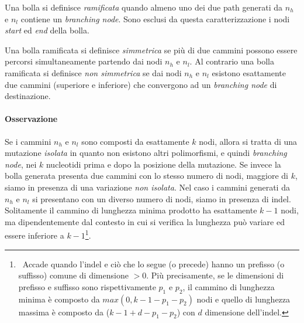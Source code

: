 \documentclass[../main.tex]{subfiles}
\begin{document}
\begin{definition}
Una bolla si definisce \textit{ramificata} quando almeno uno dei due path generati da $n_h$ e $n_l$ contiene un \textit{branching node}. Sono esclusi da questa caratterizzazione i nodi \textit{start} ed \textit{end} della bolla.
\end{definition}

\begin{definition}
Una bolla ramificata si definisce \textit{simmetrica} se più di due cammini possono essere percorsi simultaneamente partendo dai nodi $n_h$ e $n_l$. Al contrario una bolla ramificata si definisce \textit{non simmetrica} se dai nodi $n_h$ e $n_l$ esistono esattamente due cammini (superiore e inferiore) che convergono ad un \textit{branching node} di destinazione.
\end{definition}

\paragraph{Osservazione} Se i cammini $n_h$ e $n_l$ sono composti da esattamente $k$ nodi, allora si tratta di una mutazione \textit{isolata} in quanto non esistono altri polimorfismi, e quindi \textit{branching node}, nei $k$ nucleotidi prima e dopo la posizione della mutazione. Se invece la bolla generata presenta due cammini con lo stesso numero di nodi, maggiore di $k$, siamo in presenza di una variazione \textit{non isolata}. Nel caso i cammini generati da $n_h$ e $n_l$ si presentano con un diverso numero di nodi, siamo in presenza di indel. Solitamente il cammino di lunghezza minima prodotto ha esattamente $k-1$ nodi, ma dipendentemente dal contesto in cui si verifica la lunghezza può variare ed essere inferiore a $k-1$\footnote{\ Accade quando l'indel e ciò che lo segue (o precede) hanno un prefisso (o suffisso) comune di dimensione $> 0$. Più precisamente, se le dimensioni di prefisso e suffisso sono rispettivamente $p_1$ e $p_2$, il cammino di lunghezza minima è composto da $max(0, k-1-p_1 - p_2)$ nodi e quello di lunghezza massima è composto da ($k-1+d-p_1 - p_2$) con $d$ dimensione dell'indel.}.
\end{document}

